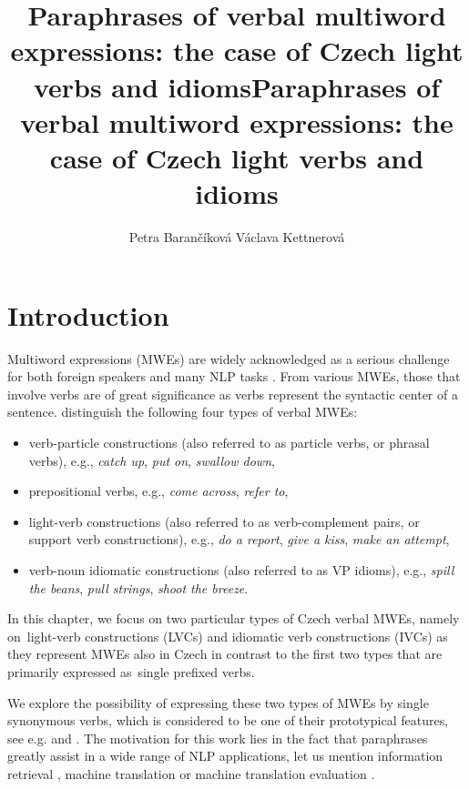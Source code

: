 \documentclass[output=paper
,modfonts
,nonflat]{langsci/langscibook}
\title{Paraphrases of verbal multiword expressions: the case of Czech light verbs and idioms}
\author{%
Petra Barančíková\affiliation{Charles University}\lastand
    Václava Kettnerová\affiliation{Charles University} 
}
\title{Paraphrases of verbal multiword expressions: the case of Czech light verbs and idioms}
\begin{document}
\maketitle

\section{Introduction}

Multiword expressions (MWEs) are widely acknowledged as a serious challenge for 
both foreign speakers and many NLP tasks \citep{Sag2002a}. 
From various MWEs, those that involve verbs are of great significance 
as verbs represent the syntactic center of a sentence. \citet{baldwin2010multiword}
distinguish the following four types of verbal MWEs:

\begin{itemize}
\item 
verb-particle constructions (also referred to as particle verbs, or phrasal 
verbs), e.g., \textit{catch up}, \textit{put on}, \textit{swallow down},
\item
prepositional verbs, e.g., \textit{come across}, \textit{refer to},
\item
light-verb constructions (also referred to as verb-complement pairs, or support 
verb constructions), e.g., \textit{do a report}, \textit{give a kiss}, 
\textit{make an attempt}, %
\item
verb-noun idiomatic constructions (also referred to as VP idioms), e.g., 
\textit{spill the beans}, \textit{pull strings}, \textit{shoot the breeze}.
\end{itemize}


In this chapter, we focus on two particular types of Czech verbal MWEs, namely
on~light-verb constructions (LVCs) and idiomatic verb constructions (IVCs) as 
they represent  MWEs also in Czech in contrast to the first two types that are 
primarily expressed as~single prefixed verbs. 

We explore the possibility of expressing these two types of MWEs by single 
synonymous verbs, which is considered to be one of their prototypical features, 
see e.g. \citet{chafe-68} and \citet{fillmore-88}. The motivation for this work 
lies in the fact that paraphrases greatly assist in a wide range of NLP 
applications, let us mention information retrieval \citep{wallisinformation}, 
machine translation \citep{Madnani:2013,Callison-Burch:2006,Marton:2009} 
or machine translation evaluation \citep{Kauchak:2006,Zhou:2006,BaRoImprovingEvaluation2014}. 
\end{document}

